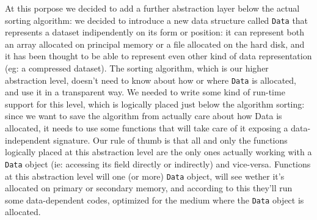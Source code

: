 At this porpose we decided to add a further abstraction layer below the actual sorting algorithm: we decided to introduce a new data structure called \texttt{Data} that represents a dataset indipendently on its form or position: it can represent both an array allocated on principal memory or a file allocated on the hard disk, and it has been thought to be able to represent even other kind of data representation (eg: a compressed dataset). The sorting algorithm, which is our higher abstraction level, doesn't need to know about how or where \texttt{Data} is allocated, and use it in a transparent way.
We needed to write some kind of run-time support for this level, which is logically placed just below the algorithm sorting: since we want to save the algorithm from actually care about how Data is allocated, it needs to use some functions that will take care of it exposing a data-independent signature. Our rule of thumb is that all and only the functions logically placed at this abstraction level are the only ones actually working with a \texttt{Data} object (ie: accessing its field directly or indirectly) and vice-versa.
Functions at this abstraction level will one (or more) \texttt{Data} object, will see wether it's allocated on primary or secondary memory, and according to this they'll run some data-dependent codes, optimized for the medium where the \texttt{Data} object is allocated.




